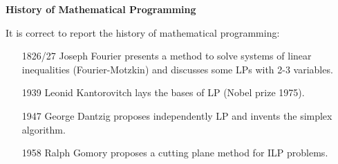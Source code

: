 \newpage

\begin{flushleft}
    \textcolor{Red2}{ \textbf{History of Mathematical Programming}}
\end{flushleft}
It is correct to report the history of mathematical programming:
\begin{itemize}
    \item[1826/27] Joseph Fourier presents a method to solve systems of linear inequalities (Fourier-Motzkin) and discusses some LPs with 2-3 variables.
    
    \item[1939] Leonid Kantorovitch lays the bases of LP (Nobel prize 1975).
    
    \item[1947] George Dantzig proposes independently LP and invents the simplex algorithm.

    \item[1958] Ralph Gomory proposes a cutting plane method for ILP problems.
\end{itemize}